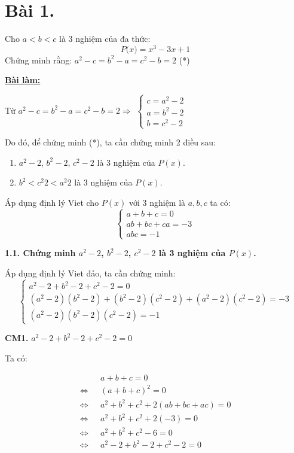 \section*{Bài 1.}

Cho $a < b < c$ là 3 nghiệm của đa thức:
$$P \big( x \big) = x^3 - 3x + 1$$
Chứng minh rằng: $a^2 - c = b^2 - a = c^2 - b = 2$ (*)
	

\centering
\textbf{\underline{Bài làm:}}

\justifying
Từ $a^2 - c = b^2 - a = c^2 - b = 2 \Rightarrow$
$ \begin{cases}
    c = a^2 - 2\\
    a = b^2 - 2\\
    b = c^2 - 2
\end{cases} $

Do đó, để chứng minh (*), ta cần chứng minh 2 điều sau:
\begin{enumerate}
    \item $a^2 - 2$, $b^2 - 2$, $c^2 -2$ là 3 nghiệm của $P(x)$.
    \item $b^2 < c^2 2 < a^2 2$ là 3 nghiệm của $P(x)$.
\end{enumerate}

Áp dụng định lý Viet cho $P(x)$ với 3 nghiệm là $a, b, c$ ta có:
$$\begin{cases}
    a + b + c = 0\\
    ab + bc + ca = -3\\
    abc = -1 
\end{cases}$$

\textbf{1.1. Chứng minh $a^2 - 2$, $b^2 - 2$, $c^2 -2$ là 3 nghiệm của $P(x)$.}

Áp dụng định lý Viet đảo, ta cần chứng minh:
$$\begin{cases}
    a^2 - 2 + b^2 - 2 + c^2 - 2 = 0\\
    (a^2 - 2)(b^2 - 2) + (b^2 -2)(c^2 - 2) + (a^2 -2)(c^2 - 2) = -3\\
    (a^2 - 2)(b^2 - 2)(c^2 - 2) = -1
\end{cases}$$

\textbf{CM1. } $a^2 - 2 + b^2 - 2 + c^2 - 2 = 0$

Ta có: 

\begin{align*}
    &a + b + c = 0 \\
    \Leftrightarrow \text{ } &(a + b + c)^2 = 0\\
    \Leftrightarrow \text{ } &a^2 + b^2 + c^2 + 2(ab + bc + ac) = 0\\
    \Leftrightarrow \text{ } &a^2 + b^2 + c^2 + 2(-3) = 0\\
    \Leftrightarrow \text{ } &a^2 + b^2 + c^2 -6 = 0\\
    \Leftrightarrow \text{ } &a^2 - 2 + b^2 - 2 + c^2 - 2 = 0
\end{align*}

